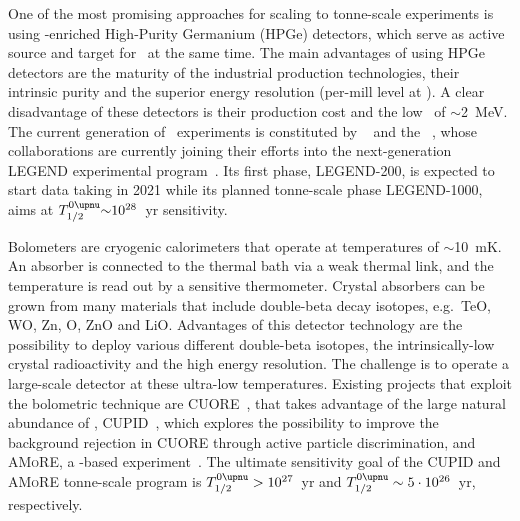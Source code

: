 \begin{description}[wide]

  \item[Semiconductors] One of the most promising approaches for scaling to tonne-scale
    experiments is using \gesix-enriched High-Purity Germanium (HPGe) detectors, which
    serve as active source and target for \onbb\ at the same time. The main advantages of
    using HPGe detectors are the maturity of the industrial production technologies, their
    intrinsic purity and the superior energy resolution (per-mill level at \qbb).  A clear
    disadvantage of these detectors is their production cost and the low \qbb\ of
    $\sim$2~MeV. The current generation of \gesix\ experiments is constituted by
    \gerda~\cite{Budjas2013} and the \majoranademo~\cite{Abgrall2014}, whose collaborations
    are currently joining their efforts into the next-generation LEGEND experimental
    program~\cite{Abgrall2017}. Its first phase, LEGEND-200, is expected to start data
    taking in 2021 while its planned tonne-scale phase LEGEND-1000, aims at $\thalfzeroM
    {\sim}10^{28}$~yr sensitivity.

  \item[Bolometers] Bolometers are cryogenic calorimeters that operate at temperatures of
    $\sim$10~mK. An absorber is connected to the thermal bath via a weak thermal link, and
    the temperature is read out by a sensitive thermometer. Crystal absorbers can be grown
    from many materials that include double-beta decay isotopes, e.g.~TeO,
    WO, Zn, O,
    ZnO and  LiO.  Advantages
    of this detector technology are the possibility to deploy various different
    double-beta isotopes, the intrinsically-low crystal radioactivity and the high energy
    resolution. The challenge is to operate a large-scale detector at these ultra-low
    temperatures. Existing projects that exploit the bolometric technique are
    CUORE~\cite{Arnaboldi2002, Artusa2014}, that takes advantage of the large natural
    abundance of , CUPID~\cite{Wang2015}, which explores the possibility to
    improve the background rejection in CUORE through active particle discrimination, and
    \textsc{AMoRE}, a -based experiment~\cite{Kim2015}. The ultimate
    sensitivity goal of the CUPID and \textsc{AMoRE} tonne-scale program is $\thalfzeroM >
    10^{27}$~yr and $\thalfzeroM \sim 5 \cdot 10^{26}$~yr, respectively.


\end{description}
